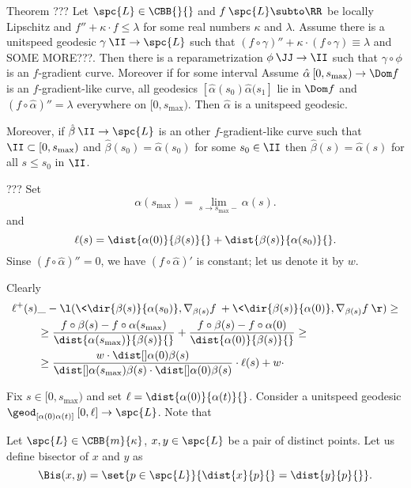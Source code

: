 \begin{thm}{Theorem} \label{thm:grad-curv-unique-past}
???
Let $\spc{L}\in\CBB{}{}$ 
and
$f\:\spc{L}\subto \RR$ 
be locally Lipschitz and $f''+\kappa\cdot f\le \lambda$ for some real numbers $\kappa$ and $\lambda$.
Assume there is a unitspeed geodesic $\gamma\:\II\to\spc{L}$ such that $(f\circ\gamma)''+\kappa\cdot (f\circ\gamma)\equiv\lambda$ and SOME MORE???.
Then there is a reparametrization $\phi\:\JJ\to\II$ such that
$\gamma\circ\phi$ is an $f$-gradient curve.
Moreover if for some interval 
Assume $\hat\alpha\:[0,s_{\max})\to\Dom f$ is an $f$-gradient-like curve,
all geodesics $[\hat\alpha(s_0)\hat\alpha(s_1]$ lie in $\Dom f$
and $(f\circ\hat\alpha)''=\lambda$ everywhere on $[0,s_{\max})$.
Then $\hat\alpha$ is a unitspeed geodesic.

Moreover, if $\hat\beta\:\II\to\spc{L}$ is an other $f$-gradient-like curve 
such that $\II\subset[0,s_{\max})$ 
and $\hat\beta(s_0)=\hat\alpha(s_0)$ for some $s_0\in\II$ 
then $\hat\beta(s)=\hat\alpha(s)$ for all $s\le s_0$ in $\II$.
\end{thm} 

???
Set 
$$\alpha(s_{\max})=\lim_{s\to s_{\max}-}\alpha(s).$$
and
$$\ell(s)
=
\dist{\alpha(0)}{\beta(s)}{}+\dist{\beta(s)}{\alpha(s_0)}{}.$$
Sinse $(f\circ\hat\alpha)''=0$, we have $(f\circ\hat\alpha)'$ is constant;
let us denote it by $w$.

Clearly
\begin{align*}
\ell^+(s)
&\ae
-\l(\<\dir{\beta(s)}{\alpha(s_0)},
\nabla_{\beta(s)}f\>
+
\<\dir{\beta(s)}{\alpha(0)},
\nabla_{\beta(s)}f\>
\r)\ge
\\
&\ge \frac{f\circ\beta(s)-f\circ\alpha(s_{\max})}{\dist{\alpha(s_{\max})}{\beta(s)}{}}
+
\frac{f\circ\beta(s)-f\circ\alpha(0)}{\dist{\alpha(0)}{\beta(s)}{}}
\ge
\\
&\ge 
\frac{w\cdot\dist[{{}}]{\alpha(0)}{\beta(s)}{}}%
{\dist[{{}}]{\alpha(s_{\max})}{\beta(s)}{}\cdot \dist[{{}}]{\alpha(0)}{\beta(s)}{}}\cdot\ell(s)
+
w\cdot
\end{align*}


Fix $s\in[0,s_{\max})$ and set $\ell=\dist{\alpha(0)}{\alpha(t)}{}$.
Consider a unitspeed geodesic 
$\geod_{[\alpha(0)\alpha(t)]}\:[0,\ell]\to\spc{L}$.
Note that 

\qeds





Let $\spc{L}\in\CBB{m}{\kappa}$,
$x,y\in \spc{L}$ be a pair of distinct points.
Let us define bisector of $x$ and $y$ as
$$\Bis(x,y)=\set{p\in\spc{L}}{\dist{x}{p}{}=\dist{y}{p}{}}.$$


